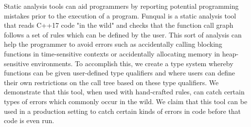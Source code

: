 Static analysis tools can aid programmers by reporting potential programming mistakes prior to the execution of a program.  Funqual is a static analysis tool that reads C++17 code "in the wild" and checks that the function call graph follows a set of rules which can be defined by the user.  This sort of analysis can help the programmer to avoid errors such as accidentally calling blocking functions in time-sensitive contexts or accidentally allocating memory in heap-sensitive environments.  To accomplish this, we create a type system whereby functions can be given user-defined type qualifiers and where users can define their own restrictions on the call tree based on these type qualifiers.  We demonstrate that this tool, when used with hand-crafted rules, can catch certain types of errors which commonly occur in the wild.  We claim that this tool can be used in a production setting to catch certain kinds of errors in code before that code is even run.  

